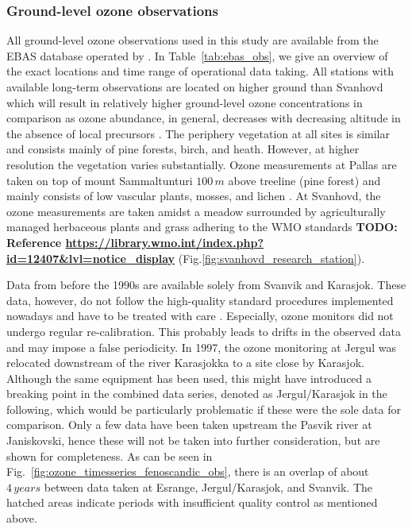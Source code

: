 \documentclass[bg, manuscript]{copernicus}
\begin{document}
\subsubsection{Ground-level ozone observations}
\label{subsubsec:ebas}
All ground-level ozone observations used in this study are available from the EBAS database operated by \citet{NILU_EBAS}. In Table~\ref{tab:ebas_obs}, we give an overview of the exact locations and time range of operational data taking. All stations with available long-term observations are located on higher ground than Svanhovd which will result in relatively higher ground-level ozone concentrations in comparison as ozone abundance, in general, decreases with decreasing altitude in the absence of local precursors \citep[e.g.,][]{AB:Klingberg2009}. The periphery vegetation at all sites is similar and consists mainly of pine forests, birch, and heath. However, at higher resolution the vegetation varies substantially. Ozone measurements at Pallas are taken on top of mount Sammaltunturi $100\,\unit{m}$ above treeline (pine forest) and mainly consists of low vascular plants, mosses, and lichen \citep{BER:Hatakka2003}. At Svanhovd, the ozone measurements are taken amidst a meadow surrounded by agriculturally managed herbaceous plants and grass adhering to the WMO standards {\bf TODO: Reference \url{https://library.wmo.int/index.php?id=12407&lvl=notice_display}} (Fig.\ref{fig:svanhovd_research_station}).

Data from before the 1990s are available solely from Svanvik and Karasjok. These data, however, do not follow the high-quality standard procedures implemented nowadays and have to be treated with care \citep{NILU2003}. Especially, ozone monitors did not undergo regular re-calibration. This probably leads to drifts in the observed data and may impose a false periodicity. In 1997, the ozone monitoring at Jergul was relocated downstream of the river Karasjokka to a site close by Karasjok. Although the same equipment has been used, this might have introduced a breaking point in the combined data series, denoted as Jergul/Karasjok in the following, which would be particularly problematic if these were the sole data for comparison. Only a few data have been taken upstream the Pasvik river at Janiskovski, hence these will not be taken into further consideration, but are shown for completeness. As can be seen in Fig.~\ref{fig:ozone_timesseries_fenoscandic_obs}, there is an overlap of about $4\,\unit{years}$ between data taken at Esrange, Jergul/Karasjok, and Svanvik. The hatched areas indicate periods with insufficient quality control as mentioned above.
\end{document}
